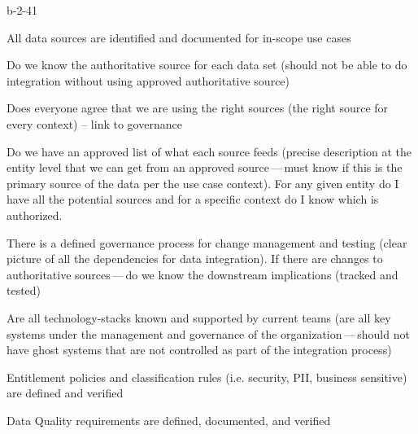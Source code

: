 \begin{level-assessment}{b-2-4}{1}

    \item All data sources are identified and documented for in-scope use cases
    \item Do we know the authoritative source for each data set (should not be able to do integration without
          using approved authoritative source)
    \item Does everyone agree that we are using the right sources (the right source for every context) --
          link to governance
    \item Do we have an approved list of what each source feeds (precise description at the entity level that
          we can get from an approved source\,---\,must know if this is the primary source of the data per the
          use case context).
          For any given entity do I have all the potential sources and for a specific context do I know which
          is authorized.
    \item There is a defined governance process for change management and testing (clear picture of all the
          dependencies for data integration).
          If there are changes to authoritative sources\,---\,do we know the downstream implications (tracked and tested)
    \item Are all \glspl{technology-stack} known and supported by current teams (are all key systems under the
          management and governance of the organization\,---\,should not have ghost systems that are not controlled
          as part of the integration process)
    \item Entitlement policies and classification rules (i.e. security, PII,
          business sensitive) are defined and verified
    \item Data Quality requirements are defined, documented, and verified

\end{level-assessment}

